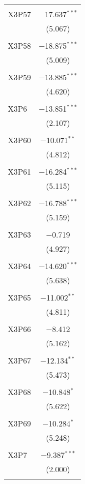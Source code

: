 \begin{table}[!htbp]
\begin{tabular}{@{\extracolsep{5pt}}lc}
  & \\ 
 X3P57 & $-$17.637$^{***}$ \\ 
  & (5.067) \\ 
  & \\ 
 X3P58 & $-$18.875$^{***}$ \\ 
  & (5.009) \\ 
  & \\ 
 X3P59 & $-$13.885$^{***}$ \\ 
  & (4.620) \\ 
  & \\ 
 X3P6 & $-$13.851$^{***}$ \\ 
  & (2.107) \\ 
  & \\ 
 X3P60 & $-$10.071$^{**}$ \\ 
  & (4.812) \\ 
  & \\ 
 X3P61 & $-$16.284$^{***}$ \\ 
  & (5.115) \\ 
  & \\ 
 X3P62 & $-$16.788$^{***}$ \\ 
  & (5.159) \\ 
  & \\ 
 X3P63 & $-$0.719 \\ 
  & (4.927) \\ 
  & \\ 
 X3P64 & $-$14.620$^{***}$ \\ 
  & (5.638) \\ 
  & \\ 
 X3P65 & $-$11.002$^{**}$ \\ 
  & (4.811) \\ 
  & \\ 
 X3P66 & $-$8.412 \\ 
  & (5.162) \\ 
  & \\ 
 X3P67 & $-$12.134$^{**}$ \\ 
  & (5.473) \\ 
  & \\ 
 X3P68 & $-$10.848$^{*}$ \\ 
  & (5.622) \\ 
  & \\ 
 X3P69 & $-$10.284$^{*}$ \\ 
  & (5.248) \\ 
  & \\ 
 X3P7 & $-$9.387$^{***}$ \\ 
  & (2.000) \\ 
  & \\ 

\end{tabular}
\end{table}
